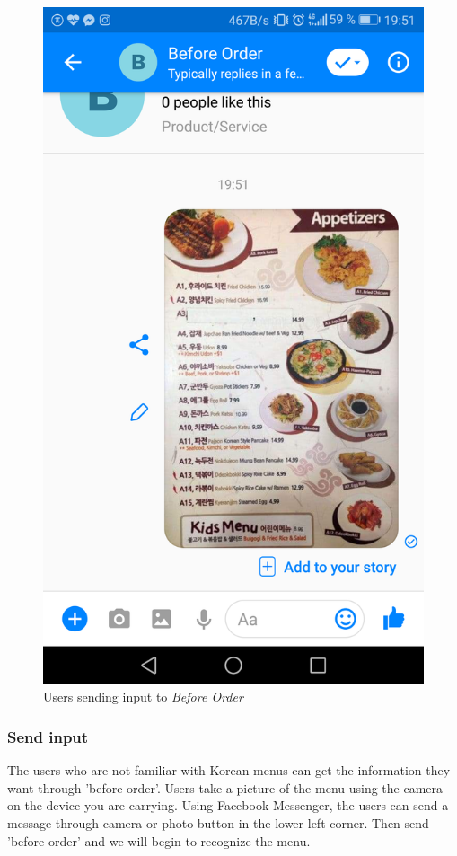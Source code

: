 \begin{figure}[htbp]
\centerline{\includegraphics[height=\custompicheight]{./pictures/Screenshot_20181125-195145}}
\caption{Users sending input to \emph{Before Order}}
\label{fig:Before Order_send_Input}
\end{figure}
\FloatBarrier
\subsubsection{Send input}
The users who are not familiar with Korean menus can get the information they want through 'before order'. Users take a picture of the menu using the camera on the device you are carrying. Using Facebook Messenger, the users can send a message through camera or photo button in the lower left corner. Then send 'before order' and we will begin to recognize the menu.


